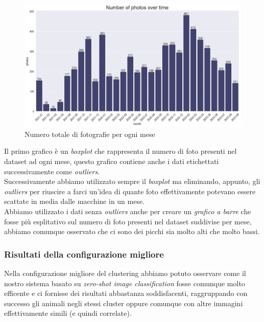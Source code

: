 \documentclass[12pt,a4paper,twoside]{article}
\begin{document}
\begin{figure}[!ht]
    \centering
    \includegraphics[width=\textwidth, height=\textheight, keepaspectratio]{assets/photos-month.png}
    \caption{Numero totale di fotografie per ogni mese}
    \label{fig:photos-month}
\end{figure}
Il primo grafico è un \textit{boxplot} che rappresenta il numero di foto presenti nel dataset ad 
ogni mese, questo grafico contiene anche i dati etichettati successivamente come 
\textit{outliers}.\\ 
Successivamente abbiamo utilizzato sempre il \textit{boxplot} ma eliminando, appunto, gli 
\textit{outliers} per riuscire a farci un'idea di quante foto effettivamente potevano essere 
scattate in media dalle macchine in un mese.\\
Abbiamo utilizzato i dati senza \textit{outliers} anche per creare un \textit{grafico a barre} 
che fosse più esplitativo sul numero di foto presenti nel dataset suddivise per mese, abbiamo 
comunque osservato che ci sono dei picchi sia molto alti che molto bassi.


\subsubsection{Risultati della configurazione migliore}
Nella configurazione migliore del clustering abbiamo potuto osservare come il nostro sistema 
basato su \textit{zero-shot image classification} fosse comunque molto efficente e ci fornisse 
dei risultati abbastanza soddisfacenti, raggruppando con successo gli animali negli stessi cluster 
oppure comunque con altre immagini effettivamente simili (e quindi correlate).\\ 
\end{document}
